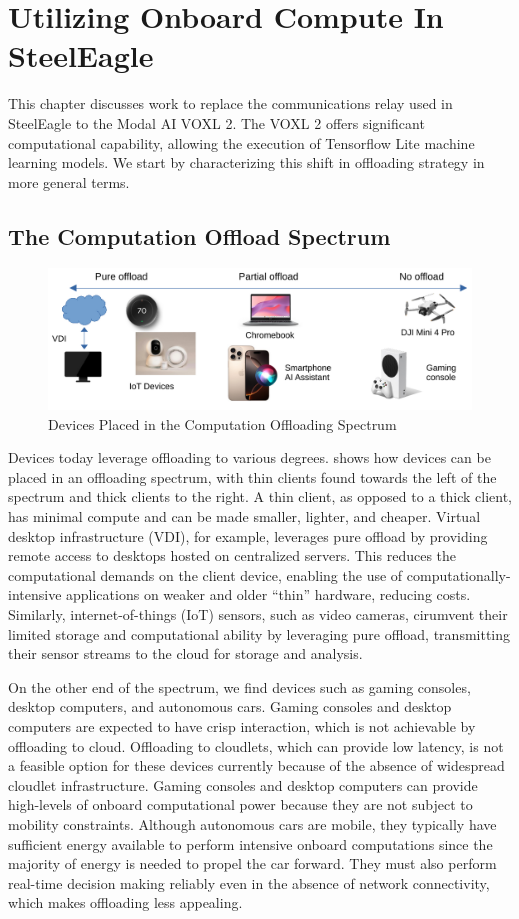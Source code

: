 \chapter{Utilizing Onboard Compute In SteelEagle}

This chapter discusses work to replace the communications relay used in
SteelEagle to the Modal AI VOXL 2. The VOXL 2 offers significant computational
capability, allowing the execution of Tensorflow Lite machine learning models.
We start by characterizing this shift in offloading strategy in more general
terms.

\section{The Computation Offload Spectrum}
\begin{figure}[htbp]
\centerline{\includegraphics[width = .8\textwidth]{figs/offload-spectrum-crop.pdf}}
\caption{Devices Placed in the Computation Offloading Spectrum}
\label{fig:offload-spectrum}
\end{figure}
Devices today leverage offloading to various degrees.
 shows how devices can be placed in an offloading
spectrum, with thin clients found towards the left of the spectrum and thick
clients to the right. A thin client, as opposed to a thick client, has minimal
compute and can be made smaller, lighter, and cheaper. Virtual desktop
infrastructure (VDI), for example, leverages pure offload by providing remote
access to desktops hosted on centralized servers.  This reduces the
computational demands on the client device, enabling the use of
computationally-intensive applications on weaker and older ``thin'' hardware,
reducing costs. Similarly, internet-of-things (IoT) sensors, such as video
cameras, cirumvent their limited storage and computational ability by
leveraging pure offload, transmitting their sensor streams to the cloud for
storage and analysis.

On the other end of the spectrum, we find devices such as gaming consoles,
desktop computers, and autonomous cars. Gaming consoles and desktop computers
are expected to have crisp interaction, which is not achievable by offloading
to cloud. Offloading to cloudlets, which can provide low latency, is not a
feasible option for these devices currently because of the absence of
widespread cloudlet infrastructure.  Gaming consoles and desktop computers can
provide high-levels of onboard computational power because they are not subject
to mobility constraints.  Although autonomous cars are mobile, they typically
have sufficient energy available to perform intensive onboard computations
since the majority of energy is needed to propel the car forward. They must
also perform real-time decision making reliably even in the absence of network
connectivity, which makes offloading less appealing.

